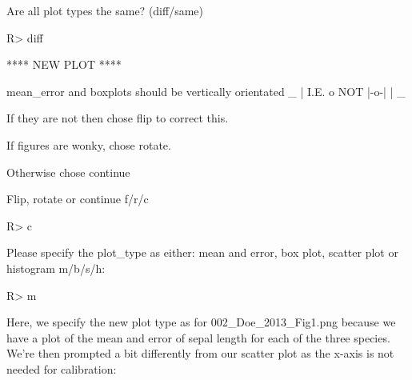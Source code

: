 \documentclass[article]{jss}
\begin{document}
\begin{CodeChunk}
\begin{CodeOutput}
Are all plot types the same? (diff/same) 
\end{CodeOutput}
\begin{CodeInput}
R> diff
\end{CodeInput}
\begin{CodeOutput}
**** NEW PLOT ****

mean_error and boxplots should be vertically orientated
       _ 
       |  
  I.E. o    NOT  |-o-|
       |
       _

If they are not then chose flip to correct this.

If figures are wonky, chose rotate.

Otherwise chose continue

Flip, rotate or continue f/r/c 
\end{CodeOutput}
\begin{CodeInput}
R> c
\end{CodeInput}
\begin{CodeOutput}
Please specify the plot_type as either: mean and error, box plot,
scatter plot or histogram m/b/s/h: 
\end{CodeOutput}
\begin{CodeInput}
R> m
\end{CodeInput}
\end{CodeChunk}

Here, we specify the new plot type as  for 002\_Doe\_2013\_Fig1.png because we have a plot of the mean and error of sepal length for each of the three species. We're then prompted a bit differently from our scatter plot as the x-axis is not needed for calibration:
\end{document}
